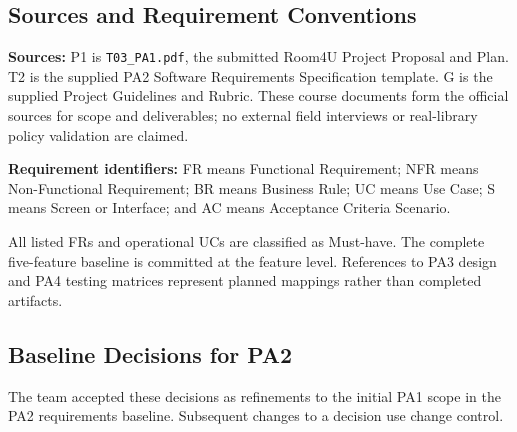 \subsection{Sources and Requirement Conventions}
\textbf{Sources:} P1 is \texttt{T03\_PA1.pdf}, the submitted Room4U Project Proposal and Plan. T2 is the supplied PA2 Software Requirements Specification template. G is the supplied Project Guidelines and Rubric. These course documents form the official sources for scope and deliverables; no external field interviews or real-library policy validation are claimed.

\textbf{Requirement identifiers:} FR means Functional Requirement; NFR means Non-Functional Requirement; BR means Business Rule; UC means Use Case; S means Screen or Interface; and AC means Acceptance Criteria Scenario.

All listed FRs and operational UCs are classified as Must-have. The complete five-feature baseline is committed at the feature level. References to PA3 design and PA4 testing matrices represent planned mappings rather than completed artifacts.

\subsection{Baseline Decisions for PA2}
The team accepted these decisions as refinements to the initial PA1 scope in the PA2 requirements baseline. Subsequent changes to a decision use change control.

